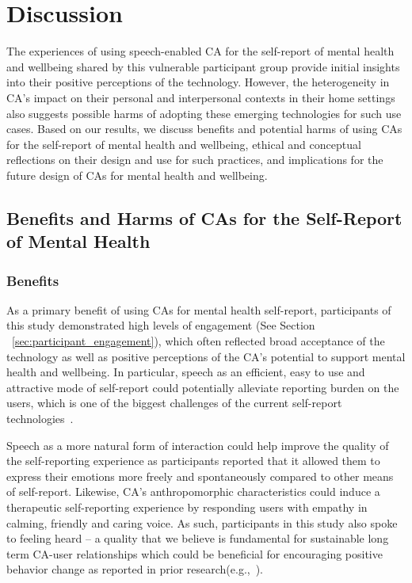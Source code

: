 
\section{Discussion}
The experiences of using speech-enabled \ac{CA} for the self-report of mental health and wellbeing shared by this vulnerable participant group provide initial insights into their positive perceptions of the technology.
% 
However, the heterogeneity in \ac{CA}'s impact on their personal and interpersonal contexts in their home settings also suggests possible harms of adopting these emerging technologies for such use cases.
% 
Based on our results, we discuss benefits and potential harms of using \ac{CA}s for the self-report of mental health and wellbeing, ethical and conceptual reflections on their design and use for such practices, and implications for the future design of \ac{CA}s for mental health and wellbeing.

    \subsection{Benefits and Harms of \acl{CA}s for the Self-Report of Mental Health}
        
        \subsubsection{Benefits}
        As a primary benefit of using \ac{CA}s for mental health self-report, participants of this study demonstrated high levels of engagement (See Section ~\ref{sec:participant_engagement}), which often reflected broad acceptance of the technology as well as positive perceptions of the \ac{CA}'s potential to support mental health and wellbeing. In particular, speech as an efficient, easy to use and attractive mode of self-report could potentially alleviate reporting burden on the users, which is one of the biggest challenges of the current self-report technologies~\cite{harari2016using, van2017experience, doherty2020design}. 
        
        Speech as a more natural form of interaction could help improve the quality of the self-reporting experience as participants reported that it allowed them to express their emotions more freely and spontaneously compared to other means of self-report. Likewise, \ac{CA}'s anthropomorphic characteristics could induce a therapeutic self-reporting experience by responding users with empathy in calming, friendly and caring voice. As such, participants in this study also spoke to feeling heard -- a quality that we believe is fundamental for sustainable long term \ac{CA}-user relationships which could be beneficial for encouraging positive behavior change as reported in prior research(e.g.,~\cite{thieme2015designing, bickmore2005establishing}).
        
